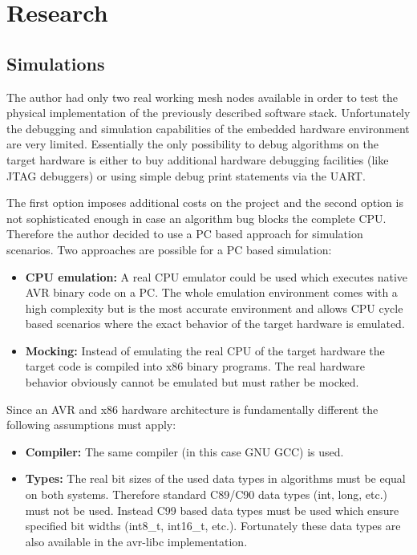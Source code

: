 \chapter{Research}%
\section{Simulations}%
The author had only two real working mesh nodes available in order to test the physical implementation of the previously described software stack. Unfortunately the debugging and simulation capabilities of the embedded hardware environment are very limited. Essentially the only possibility to debug algorithms on the target hardware is either to buy additional hardware debugging facilities (like JTAG debuggers) or using simple debug print statements via the UART.

The first option imposes additional costs on the project and the second option is not sophisticated enough in case an algorithm bug blocks the complete CPU. Therefore the author decided to use a PC based approach for simulation scenarios. Two approaches are possible for a PC based simulation:

\begin{itemize}
    \item \textbf{CPU emulation:} A real CPU emulator could be used which executes native AVR binary code on a PC. The whole emulation environment comes with a high complexity but is the most accurate environment and allows CPU cycle based scenarios where the exact behavior of the target hardware is emulated.
    \item \textbf{Mocking:} Instead of emulating the real CPU of the target hardware the target code is compiled into x86 binary programs. The real hardware behavior obviously cannot be emulated but must rather be mocked.
\end{itemize}

Since an AVR and x86 hardware architecture is fundamentally different the following assumptions must apply:

\begin{itemize}
    \item \textbf{Compiler:} The same compiler (in this case GNU GCC) is used.
    \item \textbf{Types:} The real bit sizes of the used data types in algorithms must be equal on both systems. Therefore standard C89/C90 data types (int, long, etc.) must not be used. Instead C99 based data types must be used which ensure specified bit widths (int8\_t, int16\_t, etc.). Fortunately these data types are also available in the avr-libc implementation.
\end{itemize}


